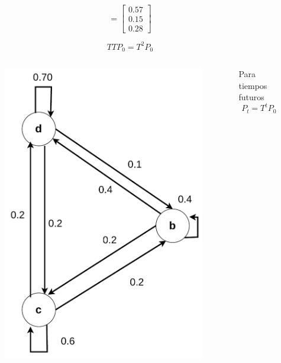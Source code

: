 \documentclass[11pt]{beamer}
\begin{document}
\begin{frame}
\begin{columns}
\begin{column}{0.5\textwidth}
			\[= 					  
			\begin{bmatrix}
						0.57 \\
						0.15 \\
						0.28
					  \end{bmatrix}		 \]
					  
			\[TTP_0=T^2P_0\]
		\end{column}

	\end{columns}
	
\end{frame}

\begin{frame}\small
	\begin{columns}
		\begin{column}{0.5\textwidth}
			\vspace{-0.5cm}
			\begin{figure}
				\includegraphics[scale=0.5]{images/markov_cuatro.pdf}
			\end{figure}
		\end{column}
		\begin{column}{0.5\textwidth}
			Para tiempos futuros
			\[P_t = T^tP_0\]

		\end{column}

	\end{columns}
	
\end{frame}
\end{document}
